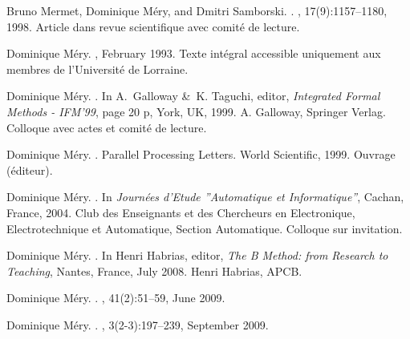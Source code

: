 \documentclass[ 12pt]{article}
\begin{document}
\begin{thebibliography}{100}
Bruno Mermet, Dominique M{\'e}ry, and Dmitri Samborski.
.
, 17(9):1157--1180, 1998.
\newblock Article dans revue scientifique avec comit{\'e} de lecture.

Dominique M{\'e}ry.
,
  February 1993.
\newblock Texte int{\'e}gral accessible uniquement aux membres de
  l'Universit{\'e} de Lorraine.

Dominique M{\'e}ry.
.
\newblock In A.~Galloway \&~K. Taguchi, editor, {\em {Integrated Formal Methods
  - IFM'99}}, page 20 p, York, UK, 1999. {A. Galloway}, {Springer Verlag}.
\newblock Colloque avec actes et comit{\'e} de lecture.

Dominique M{\'e}ry.
.
\newblock Parallel Processing Letters. {World Scientific}, 1999.
\newblock Ouvrage ({\'e}diteur).

Dominique M{\'e}ry.
.
\newblock In {\em {Journ{\'e}es d'Etude ''Automatique et Informatique''}},
  Cachan, France, 2004. {Club des Enseignants et des Chercheurs en
  Electronique, Electrotechnique et Automatique, Section Automatique}.
\newblock Colloque sur invitation.

Dominique M{\'e}ry.
.
\newblock In Henri Habrias, editor, {\em {The B Method: from Research to
  Teaching}}, Nantes, France, July 2008. {Henri Habrias}, {APCB}.

Dominique M{\'e}ry.
.
, 41(2):51--59, June 2009.

Dominique M{\'e}ry.
.
,
  3(2-3):197--239, September 2009.


\end{thebibliography}
\end{document}
